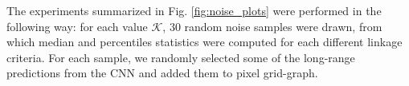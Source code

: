The experiments summarized in Fig. \ref{fig:noise_plots} were performed in the following way: for each value $\mathcal{K}$, 30 random noise samples were drawn, from which median and percentiles statistics were computed for each different linkage criteria. For each sample, we randomly selected some of the long-range predictions from the CNN and added them to pixel grid-graph.
